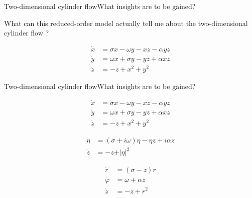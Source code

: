 \documentclass[usenames,dvipsnames,svgnames,10pt,aspectratio=169]{beamer}
\begin{document}
\begin{frame}[t, c]{Two-dimensional cylinder flow}{What insights are to be gained?}
  \begin{minipage}{.68\textwidth}
    \centering
    What can this reduced-order model actually tell me about the two-dimensional cylinder flow ?
  \end{minipage}%
  \hfill
  \begin{minipage}{.28\textwidth}
    \[
    \begin{aligned}
      \dot{x} & = \sigma x - \omega y - xz - \alpha yz\\
      \dot{y} & = \omega x + \sigma y - yz + \alpha xz \\
      \dot{z} & = -z + x^2 + y^2
    \end{aligned}
    \]
  \end{minipage}
\end{frame}





\begin{frame}[t, c]{Two-dimensional cylinder flow}{What insights are to be gained?}
  \begin{overprint}
    \[
    \begin{aligned}
      \dot{x} & = \sigma x - \omega y - xz - \alpha yz\\
      \dot{y} & = \omega x + \sigma y - yz + \alpha xz \\
      \dot{z} & = -z + x^2 + y^2
    \end{aligned}
    \]
    
    \[
    \begin{aligned}
      \dot{\eta} & = \left( \sigma + i \omega \right) \eta - \eta z + i \alpha z \\
      \dot{z} & = - z + \vert \eta \vert^2
    \end{aligned}
    \]
    
    \[
    \begin{aligned}
      \dot{r} & = \left( \sigma - z \right) r\\
      \dot{\varphi} & = \omega + \alpha z\\
      \dot{z} & = -z + r^2
    \end{aligned}
    \]
    
  \end{overprint}
\end{frame}
\end{document}
